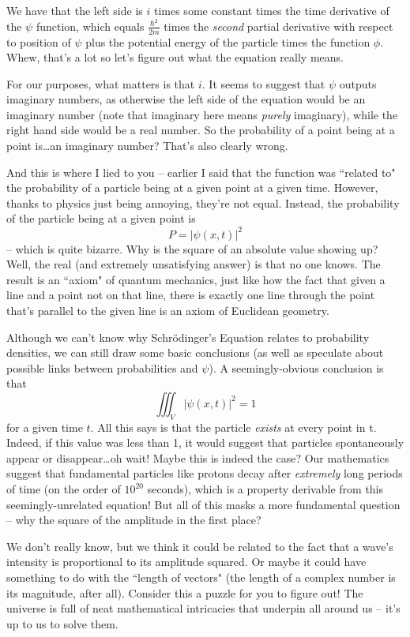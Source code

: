 \documentclass{article}
\begin{document}
\begin{multicols}{3}
We have that the left side is $i$ times some constant times the time derivative of the $\psi$ function, which equals $\frac{\hbar^2}{2m}$ times the \textit{second} partial derivative with respect to position of $\psi$ plus the potential energy of the particle times the function $\phi.$ Whew, that's a lot so let's figure out what the equation really means.

For our purposes, what matters is that $i.$ It seems to suggest that $\psi$ outputs imaginary numbers, as otherwise the left side of the equation would be an imaginary number (note that imaginary here means \textit{purely} imaginary), while the right hand side would be a real number. So the probability of a point being at a point is\dots an imaginary number? That's also clearly wrong. 

And this is where I lied to you -- earlier I said that the function was ``related to" the probability of a particle being at a given point at a given time. However, thanks to physics just being annoying, they're not equal. Instead, the probability of the particle being at a given point is
\[P=|\psi(x,t)|^2\]
-- which is quite bizarre. Why is the square of an absolute value showing up? Well, the real (and extremely unsatisfying answer) is that no one knows. The result is an ``axiom" of quantum mechanics, just like how the fact that given a line and a point not on that line, there is exactly one line through the point that's parallel to the given line is an axiom of Euclidean geometry. 

Although we can't know why Schr\"odinger's Equation relates to probability densities, we can still draw some basic conclusions (as well as speculate about possible links between probabilities and $\psi$). A seemingly-obvious conclusion is that 
\[\iiint_V |\psi(x,t)|^2 = 1\]
for a given time $t.$ All this says is that the particle \textit{exists} at every point in t. Indeed, if this value was less than 1, it would suggest that particles spontaneously appear or disappear\dots oh wait! Maybe this is indeed the case? Our mathematics suggest that fundamental particles like protons decay after \textit{extremely} long periods of time (on the order of $10^{20}$ seconds), which is a property derivable from this seemingly-unrelated equation! But all of this masks a more fundamental question -- why the square of the amplitude in the first place?

We don't really know, but we think it could be related to the fact that a wave's intensity is proportional to its amplitude squared. Or maybe it could have something to do with the ``length of vectors" (the length of a complex number is its magnitude, after all). Consider this a puzzle for you to figure out! The universe is full of neat mathematical intricacies that underpin all around us -- it's up to us to solve them.
\closearticle


\end{multicols}
\end{document}
